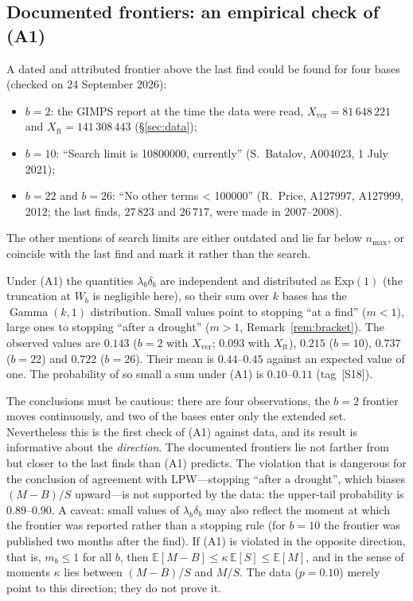 \documentclass[11pt,a4paper]{article}
\theoremstyle{plain}
\theoremstyle{remark}
\DeclareMathOperator{\Gam}{Gamma}
\begin{document}
\subsection{Documented frontiers: an empirical check of (A1)}\label{sec:frontiers}

A dated and attributed frontier above the last find could be found for four
bases (checked on 24 September 2026):
\begin{itemize}
\item $b=2$: the GIMPS report at the time the data were read,
$X_{\mathrm{ver}}=81\,648\,221$ and $X_{\mathrm{ft}}=141\,308\,443$
(\S\ref{sec:data});
\item $b=10$: ``Search limit is 10800000, currently'' (S.~Batalov, A004023,
1 July 2021);
\item $b=22$ and $b=26$: ``No other terms < 100000'' (R.~Price, A127997,
A127999, 2012; the last finds, $27\,823$ and $26\,717$, were made in
2007--2008).
\end{itemize}
The other mentions of search limits are either outdated and lie far below
$n_{\max}$, or coincide with the last find and mark it rather than the search.

Under (A1) the quantities $\lambda_b\delta_b$ are independent and distributed as
$\mathrm{Exp}(1)$ (the truncation at $W_b$ is negligible here), so their sum over
$k$ bases has the $\Gam(k,1)$ distribution. Small values point to stopping ``at a
find'' ($m<1$), large ones to stopping ``after a drought'' ($m>1$,
Remark~\ref{rem:bracket}). The observed values are $0.143$ ($b=2$ with
$X_{\mathrm{ver}}$; $0.093$ with $X_{\mathrm{ft}}$), $0.215$ ($b=10$), $0.737$
($b=22$) and $0.722$ ($b=26$). Their mean is $0.44$--$0.45$ against an expected
value of one. The probability of so small a sum under (A1) is $0.10$--$0.11$
(tag~[S18]).

The conclusions must be cautious: there are four observations, the $b=2$
frontier moves continuously, and two of the bases enter only the extended set.
Nevertheless this is the first check of (A1) against data, and its result is
informative about the \emph{direction}. The documented frontiers lie not farther
from but closer to the last finds than (A1) predicts. The violation that is
dangerous for the conclusion of agreement with LPW---stopping ``after a
drought'', which biases $(M-B)/S$ upward---is not supported by the data: the
upper-tail probability is $0.89$--$0.90$. A caveat: small values of
$\lambda_b\delta_b$ may also reflect the moment at which the frontier was
reported rather than a stopping rule (for $b=10$ the frontier was published two
months after the find). If (A1) is violated in the opposite direction, that is,
$m_b\le1$ for all $b$, then
$\mathbb E[M-B]\le\kappa\,\mathbb E[S]\le\mathbb E[M]$, and in the sense of
moments $\kappa$ lies between $(M-B)/S$ and $M/S$. The data ($p=0.10$) merely
point to this direction; they do not prove it.
\end{document}

